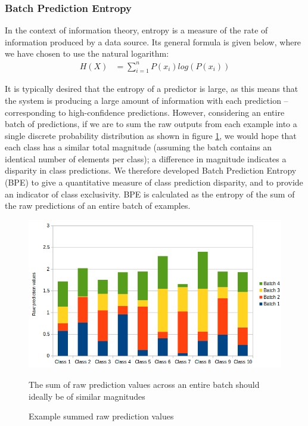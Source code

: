 \documentclass{report}
\begin{document}
\subsubsection{Batch Prediction Entropy}
In the context of information theory, entropy is a measure of the rate of information produced by a data source. Its general formula is given below, where we have chosen to use the natural logarithm:
\begin{align}
H(X) &= \sum_{i=1}^{n}P(x_i) log(P(x_i)) \label{entropyfunc}
\end{align}

It is typically desired that the entropy of a predictor is large, as this means that the system is producing a large amount of information with each prediction -- corresponding to high-confidence predictions. However, considering an entire batch of predictions, if we are to sum the raw outputs from each example into a single discrete probability distribution as shown in figure \ref{fig:totalbatchpredscores:1}, we would hope that each class has a similar total magnitude (assuming the batch contains an identical number of elements per class); a difference in magnitude indicates a disparity in class predictions. We therefore developed Batch Prediction Entropy (BPE) to give a quantitative measure of class prediction disparity, and to provide an indicator of class exclusivity. BPE is calculated as the entropy of the sum of the raw predictions of an entire batch of examples. 

\begin{figure}[h!]
	\centering
	\includegraphics[width=13cm]{totalbatchpredscores}
	\caption{Example summed raw prediction values}
	The sum of raw prediction values across an entire batch should ideally be of similar magnitudes
	\label{fig:totalbatchpredscores:1}
\end{figure}
\end{document}
